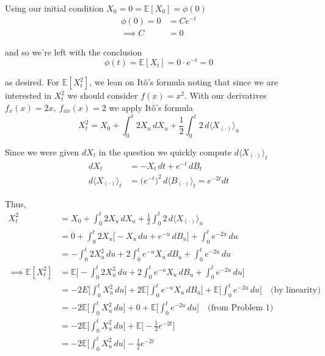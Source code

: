 \documentclass[12pt]{article}
\begin{document}
Using our initial condition $X_0 = 0 = \mathbb E[X_0] = \phi(0)$
\begin{align*}
	\phi(0) = 0 &= Ce^{-t} \\
	\implies C &= 0
\end{align*}

and so we're left with the conclusion
\begin{equation*}
	\phi(t) = \mathbb E[X_t] = 0\cdot e^{-t} = 0
\end{equation*}

as desired. For $\mathbb E[X_t^2]$, we lean on It\^{o}'s formula noting that since we are interested in $X_t^2$ we should consider $f(x) = x^2$. With our derivatives $f_x(x) = 2x,~ f_{xx}(x) = 2$ we apply It\^{o}'s formula
\begin{equation*}
	X_t^2 = X_0 + \int^t_0 2X_u \,dX_u + \frac{1}{2}\int^t_0 2\,d\langle X_{(\cdot)}\rangle_u
\end{equation*}

Since we were given $dX_t$ in the question we quickly compute $d\langle X_{(\cdot)}\rangle_t$
\begin{align*}
	dX_t &= -X_t\,dt + e^{-t}\,dB_t \\
	d\langle X_{(\cdot)}\rangle_t &= \big(e^{-t}\big)^2\,d\langle B_{(\cdot)}\rangle_t  = e^{-2t}dt
\end{align*}

Thus,
\begin{align*}
	X_t^2 &= X_0 + \int^t_0 2X_u\,dX_u + \frac{1}{2}\int^t_0 2\,d\langle X_{(\cdot)}\rangle_u \\
	&= 0 + \int^t_0 2X_u\Big[-X_u\,du + e^{-u}\,dB_u\Big] + \int^t_0 e^{-2u}\,du \\
	&= - \int^t_0 2X_u^2\,du + 2\int^t_0 e^{-u}X_u\,dB_u + \int^t_0 e^{-2u}\,du \\
\implies \mathbb E[X_t^2] &= \mathbb E\Bigg[- \int^t_0 2X_u^2\,du + 2\int^t_0 e^{-u}X_u\,dB_u + \int^t_0 e^{-2u}\,du\Bigg] \\
	&= \mathbb -2E\Bigg[\int^t_0 X_u^2\,du\Bigg] + 2\mathbb E\Bigg[\int^t_0 e^{-u}X_u\,dB_u\Bigg] + \mathbb E\Bigg[\int^t_0 e^{-2u}\,du\Bigg] \quad \text{(by linearity)}\\
	&= -2\mathbb E\Bigg[\int^t_0 X_u^2\,du\Bigg] + 0 + \mathbb E\Bigg[\int^t_0 e^{-2u}\,du\Bigg] \quad \text{(from Problem 1)} \\
	&= -2\mathbb E\Bigg[\int^t_0 X^2_u \,du\Bigg] + \mathbb E\Big[-\frac{1}{2}e^{-2t}\Big] \\
	&= -2\mathbb E\Bigg[\int^t_0 X^2_u \,du\Bigg] -\frac{1}{2}e^{-2t}
\end{align*}
\end{document}
